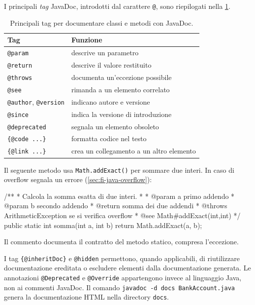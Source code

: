 I principali \emph{tag} JavaDoc, introdotti dal carattere
\texttt{@}, sono riepilogati nella
\cref{tab:fi-java-classi-javadoc-tag}.

\begin{table}[htbp]
  \centering
  \begin{tabular}{ll}
    \toprule
    \textbf{Tag} & \textbf{Funzione} \\
    \midrule
    \texttt{@param} & descrive un parametro \\
    \texttt{@return} & descrive il valore restituito \\
    \texttt{@throws} & documenta un'eccezione possibile \\
    \texttt{@see} & rimanda a un elemento correlato \\
    \texttt{@author}, \texttt{@version} & indicano autore e versione \\
    \texttt{@since} & indica la versione di introduzione \\
    \texttt{@deprecated} & segnala un elemento obsoleto \\
    \lstinline|{@code ...}| & formatta codice nel testo \\
    \lstinline|{@link ...}| & crea un collegamento a un altro elemento \\
    \bottomrule
  \end{tabular}
  \caption{Principali tag per documentare classi e metodi con JavaDoc.}
  \label{tab:fi-java-classi-javadoc-tag}
\end{table}

\clearpage

\begin{example}
Il seguente metodo usa \texttt{Math.addExact()} per
sommare due interi. In caso di overflow segnala un errore
(\cref{sec:fi-java-overflow}):
\begin{unipdcode}[language=Java]
/**
 * Calcola la somma esatta di due interi.
 *
 * @param a primo addendo
 * @param b secondo addendo
 * @return somma dei due addendi
 * @throws ArithmeticException se si verifica overflow
 * @see Math#addExact(int,int)
 */
public static int somma(int a, int b) {
    return Math.addExact(a, b);
}
\end{unipdcode}
Il commento documenta il contratto del metodo statico,
compresa l'eccezione.
\end{example}

I tag \lstinline|{@inheritDoc}| e \texttt{@hidden} permettono,
quando applicabili, di riutilizzare documentazione ereditata o
escludere elementi dalla documentazione generata. Le annotazioni
\texttt{@Deprecated} e \texttt{@Override} appartengono invece
al linguaggio Java, non ai commenti JavaDoc.
Il comando \texttt{javadoc -d docs BankAccount.java} genera
la documentazione HTML nella directory \texttt{docs}.

